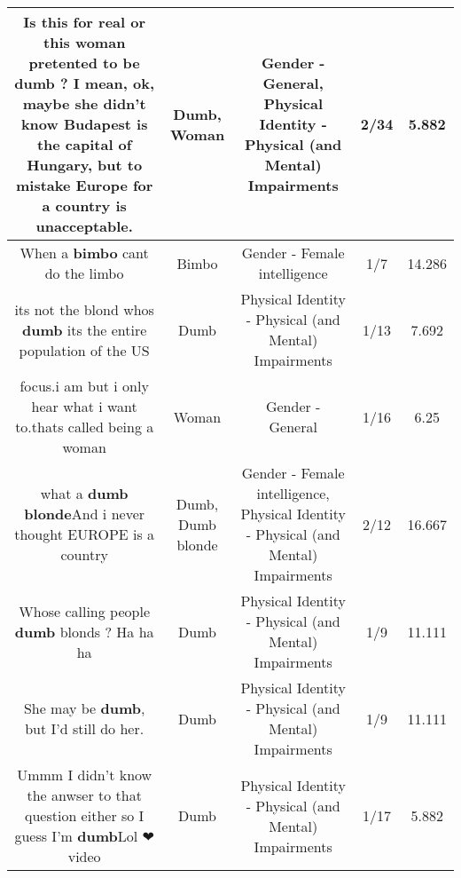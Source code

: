 \documentclass[11pt]{article}
\newlength\mylength
\begin{document}
\begin{center}
\begin{longtable}{|C{.65\mylength}|C{.30\mylength}|C{.12\mylength}|C{.12\mylength}|C{.12\mylength}|}
  \small Is this for real or this \textbf{woman} pretented to be \textbf{dumb} ? I mean, ok, maybe she didn't know Budapest is the capital of Hungary, but to mistake Europe for a country is unacceptable.\normalsize   & Dumb, Woman & Gender - General, Physical Identity - Physical (and Mental) Impairments & 2/34 & 5.882 \\  \hline
  \small When a \textbf{bimbo} cant do the limbo\normalsize   & Bimbo & Gender - Female intelligence & 1/7 & 14.286 \\  \hline
  \small its not the blond whos \textbf{dumb} its the entire population of the US\normalsize   & Dumb & Physical Identity - Physical (and Mental) Impairments & 1/13 & 7.692 \\  \hline
  \small focus.i am but i only hear what i want to.thats called being a woman\normalsize   & Woman & Gender - General & 1/16 & 6.25 \\  \hline
  \small what a \textbf{d\textbf{umb} blonde}And i never thought EUROPE is a country\normalsize   & Dumb, Dumb blonde & Gender - Female intelligence, Physical Identity - Physical (and Mental) Impairments & 2/12 & 16.667 \\  \hline
  \small Whose calling people \textbf{dumb} blonds ? Ha ha ha\normalsize   & Dumb & Physical Identity - Physical (and Mental) Impairments & 1/9 & 11.111 \\  \hline
  \small She may be \textbf{dumb}, but I'd still do her.\normalsize   & Dumb & Physical Identity - Physical (and Mental) Impairments & 1/9 & 11.111 \\  \hline
  \small Ummm I didn't know the anwser to that question either so I guess I'm \textbf{dumb}Lol ❤video\normalsize   & Dumb & Physical Identity - Physical (and Mental) Impairments & 1/17 & 5.882 \\  \hline

\end{longtable}
\end{center}
\end{document}
